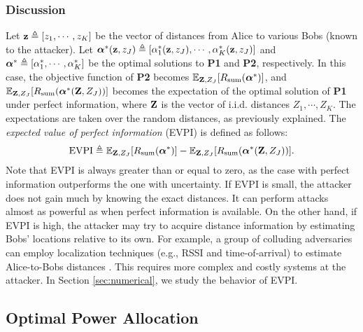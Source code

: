 \documentclass[draftclsnofoot, 12pt, onecolumn, journal]{IEEEtran}
\newcommand{\zv}{{\bf z}}
\newcommand{\Zm}{{\bf Z}}
\newcommand{\alphav}{\hbox{\boldmath$\alpha$}}
\begin{document}
\subsubsection{Discussion}
\label{sssec:dis}

Let $\zv \triangleq [z_1, \cdots, z_K]$ be the vector of distances from Alice to various Bobs (known to the attacker).
Let $\alphav^*(\zv,z_J) \triangleq [\alpha_1^*(\zv,z_J), \cdots, \alpha_K^*(\zv,z_J) ]$ and $\alphav^* \triangleq [\alpha_1^*, \cdots, \alpha_K^* ]$ be the optimal solutions to \textbf{P1} and \textbf{P2}, respectively. 
In this case, the objective function of \textbf{P2} becomes $\mathbb{E}_{\Zm,Z_J} [ R_{\text{sum}}(\alphav^*)]$, and $\mathbb{E}_{\Zm, Z_J} [ R_{\text{sum}}(\alphav^*(\Zm,Z_J))]$ becomes the expectation of the optimal solution of \textbf{P1} under perfect information, where $\Zm$ is the vector of i.i.d. distances $Z_1, \cdots, Z_K$.
The expectations are taken over the random distances, as previously explained.
The \textit{expected value of perfect information} (EVPI) is defined as follows:
%
\begin{align}
\text{EVPI} \triangleq \mathbb{E}_{\Zm,Z_J} [ R_{\text{sum}}(\alphav^*)] - \mathbb{E}_{\Zm, Z_J} [ R_{\text{sum}}(\alphav^*(\Zm,Z_J))].
\end{align} 
Note that EVPI is always greater than or equal to zero, as the case with perfect information outperforms the one with uncertainty.
If EVPI is small, the attacker does not gain much by knowing the exact distances.
It can perform attacks almost as powerful as when perfect information is available.
On the other hand, if EVPI is high, the attacker may try to acquire distance information by estimating Bobs' locations relative to its own.
For example, a group of colluding adversaries can employ localization techniques (e.g., RSSI and time-of-arrival) to estimate Alice-to-Bobs distances \cite{He2005, Sayed2005}.
This requires more complex and costly systems at the attacker.
In Section \ref{sec:numerical}, we study the behavior of EVPI.



\subsection{Optimal Power Allocation}
\label{subsec:optimalPA}
\end{document}

